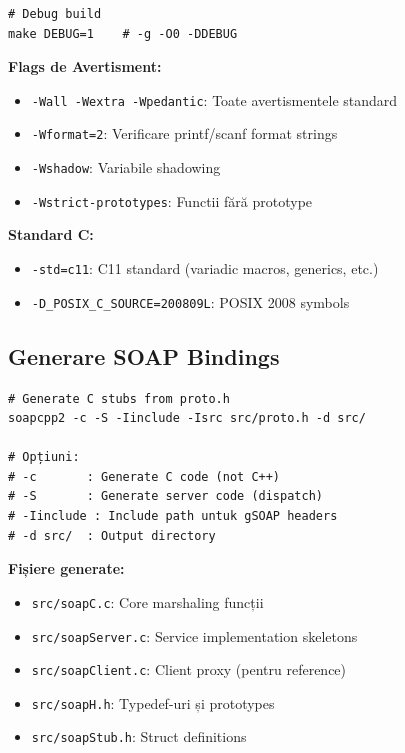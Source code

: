 \documentclass[12pt,a4paper,twoside]{article}
\begin{document}
\begin{itemize}
\begin{lstlisting}
# Debug build
make DEBUG=1    # -g -O0 -DDEBUG
\end{lstlisting}

\textbf{Flags de Avertisment:}

\begin{itemize}
    \item \texttt{-Wall -Wextra -Wpedantic}: Toate avertismentele standard
    \item \texttt{-Wformat=2}: Verificare printf/scanf format strings
    \item \texttt{-Wshadow}: Variabile shadowing
    \item \texttt{-Wstrict-prototypes}: Functii fără prototype
\end{itemize}

\textbf{Standard C:}

\begin{itemize}
    \item \texttt{-std=c11}: C11 standard (variadic macros, generics, etc.)
    \item \texttt{-D\_POSIX\_C\_SOURCE=200809L}: POSIX 2008 symbols
\end{itemize}

\subsection{Generare SOAP Bindings}

\begin{lstlisting}
# Generate C stubs from proto.h
soapcpp2 -c -S -Iinclude -Isrc src/proto.h -d src/

# Opțiuni:
# -c       : Generate C code (not C++)
# -S       : Generate server code (dispatch)
# -Iinclude : Include path untuk gSOAP headers
# -d src/  : Output directory
\end{lstlisting}

\textbf{Fișiere generate:}

\begin{itemize}
    \item \texttt{src/soapC.c}: Core marshaling funcții
    \item \texttt{src/soapServer.c}: Service implementation skeletons
    \item \texttt{src/soapClient.c}: Client proxy (pentru reference)
    \item \texttt{src/soapH.h}: Typedef-uri și prototypes
    \item \texttt{src/soapStub.h}: Struct definitions
\end{itemize}


\end{itemize}
\end{document}
